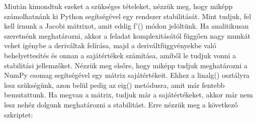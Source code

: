\documentclass{article}
\theoremstyle{definition}
\theoremstyle{theorem}
\begin{document}
Miután kimondtuk ezeket a szükséges tételeket, nézzük meg, hogy miképp számolhatnánk ki Python segítségével egy rendszer stabilitását. Mint tudjuk, fel kell írnunk a Jacobi mátrixot, amit eddig f'() módon jelöltünk. Ha analitikusan szeretnénk meghatározni, akkor a feladat komplexitásától függően nagy munkát vehet igénybe a deriváltak felírása, majd a deriváltfüggvényekbe való behelyettesítés és onnan a sajátértékek számítása, amiből le tudjuk vonni a stabilitási jellemzőket. Nézzük meg elsőre, hogy miképp tudjuk meghatározni a NumPy csomag segítségével egy mátrix sajátértékeit. Ehhez a linalg() osztályra lesz szükségünk, azon belül pedig az eig() metódusra, amit már fentebb bemutattunk. Ha megvan a mátrix, tudjuk már a sajátértékeket, akkor már nem lesz nehéz dolgunk meghatározni a stabilitást. Erre nézzük meg a következő szkriptet:


\end{document}
